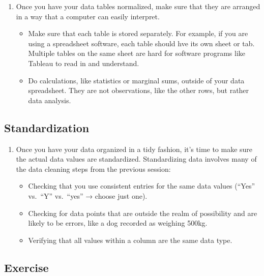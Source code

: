 \documentclass[
]{book}
\begin{document}
\begin{enumerate}
\def\labelenumi{\arabic{enumi}.}
\item
  Once you have your data tables normalized, make sure that they are arranged in a way that a computer can easily interpret.

  \begin{itemize}
  \item
    Make sure that each table is stored separately. For example, if you are using a spreadsheet software, each table should hve its own sheet or tab. Multiple tables on the same sheet are hard for software programs like Tableau to read in and understand.
  \item
    Do calculations, like statistics or marginal sums, outside of your data spreadsheet. They are not observations, like the other rows, but rather data analysis.
  \end{itemize}
\end{enumerate}

\hypertarget{standardization}{%
\subsection{Standardization}\label{standardization}}

\begin{enumerate}
\def\labelenumi{\arabic{enumi}.}
\item
  Once you have your data organized in a tidy fashion, it's time to make sure the actual data values are standardized. Standardizing data involves many of the data cleaning steps from the previous session:

  \begin{itemize}
  \item
    Checking that you use consistent entries for the same data values (``Yes'' vs.~``Y'' vs.~``yes'' → choose just one).
  \item
    Checking for data points that are outside the realm of possibility and are likely to be errors, like a dog recorded as weighing 500kg.
  \item
    Verifying that all values within a column are the same data type.
  \end{itemize}
\end{enumerate}

\hypertarget{exercise}{%
\subsection{Exercise}\label{exercise}}
\end{document}
